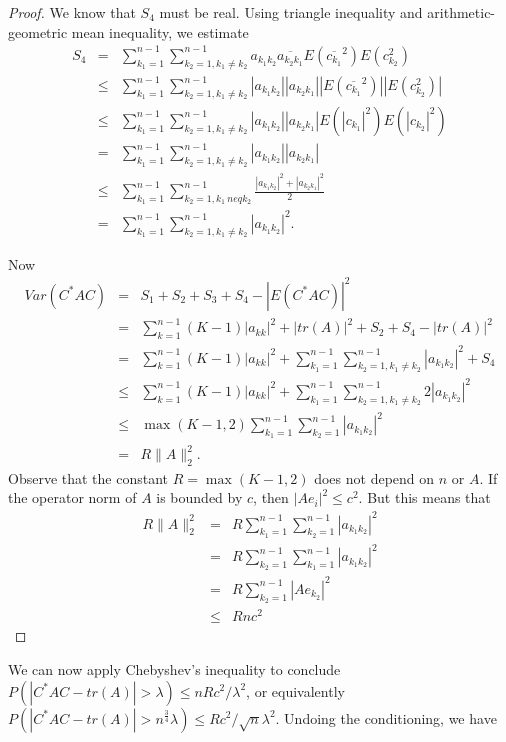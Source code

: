 \documentclass[12pt,a4paper,leqno]{report}
\theoremstyle{plain}
\theoremstyle{definition}
\theoremstyle{remark}
\begin{document}
\begin{proof}
We know that $S_4$ must be real. Using triangle inequality and arithmetic-geometric mean inequality, we estimate
\begin{eqnarray*}
S_4 & = & \sum_{k_1=1}^{n-1}\sum_{k_2=1, k_1 \neq k_2}^{n-1} a_{k_1k_2} \overline{a_{k_2k_1}}
E(\overline{c_{k_1}}^2) E( c_{k_2}^2)\\
& \leq & \sum_{k_1=1}^{n-1}\sum_{k_2=1, k_1 \neq k_2}^{n-1} |a_{k_1k_2}| |a_{k_2k_1}|
|E(\overline{c_{k_1}}^2)| |E( c_{k_2}^2)|\\
& \leq & \sum_{k_1=1}^{n-1}\sum_{k_2=1, k_1 \neq k_2}^{n-1} |a_{k_1k_2}| |a_{k_2k_1}|
E(|c_{k_1}|^2) E(|c_{k_2}|^2)\\
& = & \sum_{k_1=1}^{n-1}\sum_{k_2=1, k_1 \neq k_2}^{n-1} |a_{k_1k_2}| |a_{k_2k_1}|\\
& \leq & \sum_{k_1=1}^{n-1}\sum_{k_2=1, k_1 \ neq k_2}^{n-1} \frac{|a_{k_1k_2}|^2+|a_{k_2k_1}|^2}{2}\\
& = & \sum_{k_1=1}^{n-1}\sum_{k_2=1, k_1 \neq k_2}^{n-1} |a_{k_1k_2}|^2.
\end{eqnarray*}

Now
\begin{eqnarray*}
Var(C^* A C) & = & S_1+S_2+S_3+S_4 - |E(C^* A C)|^2\\
& = & \sum_{k=1}^{n-1} (K-1) |a_{kk}|^2 + |tr(A)|^2 + S_2+S_4 - |tr(A)|^2\\
& = &  \sum_{k=1}^{n-1} (K-1) |a_{kk}|^2 + \sum_{k_1=1}^{n-1} \sum_{k_2=1, k_1\neq k_2}^{n-1} |a_{k_1k_2}|^2+ S_4\\
& \leq & \sum_{k=1}^{n-1} (K-1) |a_{kk}|^2 + \sum_{k_1=1}^{n-1} \sum_{k_2=1, k_1\neq k_2}^{n-1} 2|a_{k_1k_2}|^2\\
& \leq & \max(K-1,2) \sum_{k_1=1}^{n-1} \sum_{k_2=1}^{n-1} |a_{k_1k_2}|^2\\
& = & R \|A\|_2^2. 
\end{eqnarray*}
Observe that the constant $R = \max(K-1,2)$ does not depend on $n$ or $A$. If the operator norm of $A$ is bounded by $c$, then $|Ae_i|^2\leq c^2$. But this means that
\begin{eqnarray*}
R \|A\|_2^2 & = & R \sum_{k_1=1}^{n-1} \sum_{k_2=1}^{n-1} |a_{k_1k_2}|^2\\
& = & R \sum_{k_2=1}^{n-1} \sum_{k_1=1}^{n-1} |a_{k_1k_2}|^2\\
& = & R \sum_{k_2=1}^{n-1} |Ae_{k_2}|^2\\
& \leq & R n c^2
\end{eqnarray*}
\end{proof}

We can now apply Chebyshev's inequality to conclude $P(|C^* A C - tr(A)|>\lambda) \leq nRc^2/\lambda^2$, or equivalently $P(|C^* A C - tr(A)|>n^{\frac{3}{4}}\lambda) \leq Rc^2/\sqrt{n}\lambda^2$. Undoing the conditioning, we have
\end{document}
